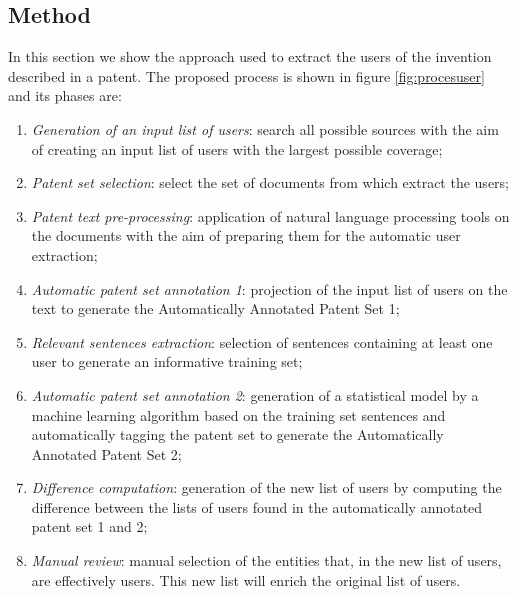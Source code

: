 \documentclass[]{book}
\begin{document}
\subsection{Method}\label{method}

In this section we show the approach used to extract the users of the
invention described in a patent. The proposed process is shown in figure
\ref{fig:procesuser} and its phases are:

\begin{enumerate}
\def\labelenumi{\arabic{enumi}.}
\item
  \emph{Generation of an input list of users}: search all possible
  sources with the aim of creating an input list of users with the
  largest possible coverage;
\item
  \emph{Patent set selection}: select the set of documents from which
  extract the users;
\item
  \emph{Patent text pre-processing}: application of natural language
  processing tools on the documents with the aim of preparing them for
  the automatic user extraction;
\item
  \emph{Automatic patent set annotation 1}: projection of the input list
  of users on the text to generate the Automatically Annotated Patent
  Set 1;
\item
  \emph{Relevant sentences extraction}: selection of sentences
  containing at least one user to generate an informative training set;
\item
  \emph{Automatic patent set annotation 2}: generation of a statistical
  model by a machine learning algorithm based on the training set
  sentences and automatically tagging the patent set to generate the
  Automatically Annotated Patent Set 2;
\item
  \emph{Difference computation}: generation of the new list of users by
  computing the difference between the lists of users found in the
  automatically annotated patent set 1 and 2;
\item
  \emph{Manual review}: manual selection of the entities that, in the
  new list of users, are effectively users. This new list will enrich
  the original list of users.
\end{enumerate}
\end{document}
